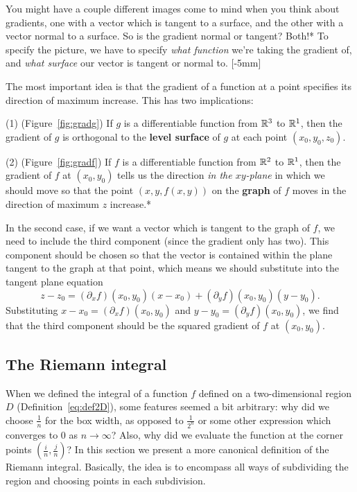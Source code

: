 \documentclass{watsonbook}
\begin{document}
You might have a couple different images come to mind when you think
about gradients, one with a vector which is tangent to a surface, and
the other with a vector normal to a surface. So is the gradient normal
or tangent? Both!* To specify the picture, we have to specify
\textit{what function} we're taking the gradient of, and \textit{what
  surface} our vector is tangent or normal to.  [-5mm]

The most important idea is that the gradient of a function at a point
specifies its direction of maximum increase. This has two
implications:

(1) (Figure~\ref{fig:gradg}) If $g$ is a differentiable function from $\mathbb{R}^3$
to $\mathbb{R}^1$, then the gradient of $g$ is orthogonal to the \textbf{level
  surface} of $g$ at each point $(x_0,y_0,z_0)$.

(2) (Figure~\ref{fig:gradf}) If $f$ is a differentiable function from
$\mathbb{R}^2$ to $\mathbb{R}^1$, then the gradient of $f$ at $(x_0,y_0)$ tells us the
direction \textit{in the $xy$-plane} in which we should move so that
the point $(x,y,f(x,y))$ on the \textbf{graph} of $f$ moves in the
direction of maximum $z$ increase.* 

In the second case, if we want a vector which is tangent to the graph
of $f$, we need to include the third component (since the gradient
only has two). This component should be chosen so that the vector is
contained within the plane tangent to the graph at that point, which
means we should substitute into the tangent plane equation
\[
  z - z_0 = (\partial_x f)(x_0,y_0)(x-x_0) +  (\partial_y
  f)(x_0,y_0)(y-y_0). 
\]
Substituting $x-x_0 = (\partial_x f)(x_0,y_0)$ and $y-y_0 =
(\partial_y f)(x_0,y_0)$, we find that the third component should be
the squared gradient of $f$ at $(x_0,y_0)$.

\newpage

\subsection{The Riemann integral} \label{sec:riemannintegral} 

When we defined the integral of a function $f$ defined on a
two-dimensional region $D$ (Definition~\ref{eq:def2D}), some features
seemed a bit arbitrary: why did we choose $\tfrac1n$ for the box
width, as opposed to $\tfrac1{2^n}$ or some other expression which
converges to 0 as $n\to\infty$? Also, why did we evaluate the function
at the corner points $\left(\tfrac in, \tfrac jn\right)$? In this
section we present a more canonical definition of the Riemann
integral. Basically, the idea is to encompass all ways of subdividing
the region and choosing points in each subdivision.
\end{document}

